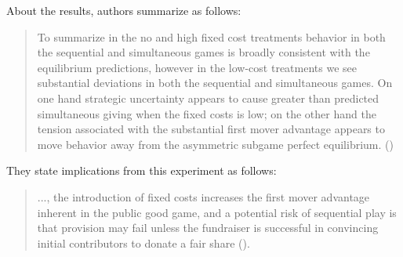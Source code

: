 \documentclass[../root]{subfiles}
\begin{document}
    About the results, authors summarize as follows:

    \begin{quote}
        To summarize in the no and high fixed cost treatments behavior in both the sequential and simultaneous games is broadly consistent with the equilibrium predictions, however in the low-cost treatments we see substantial deviations in both the sequential and simultaneous games. On one hand strategic uncertainty appears to cause greater than predicted simultaneous giving when the fixed costs is low; on the other hand the tension associated with the substantial first mover advantage appears to move behavior away from the asymmetric subgame perfect equilibrium. (\citealp[p.425]{Bracha2011})
    \end{quote}

    They state implications from this experiment as follows:
    
    \begin{quote}
        ..., the introduction of fixed costs increases the first mover advantage inherent in the public good game, and a potential risk of sequential play is that provision may fail unless the fundraiser is successful in convincing initial contributors to donate a fair share (\citealp[p.426]{Bracha2011}).
    \end{quote}



    \biblio
\end{document}
